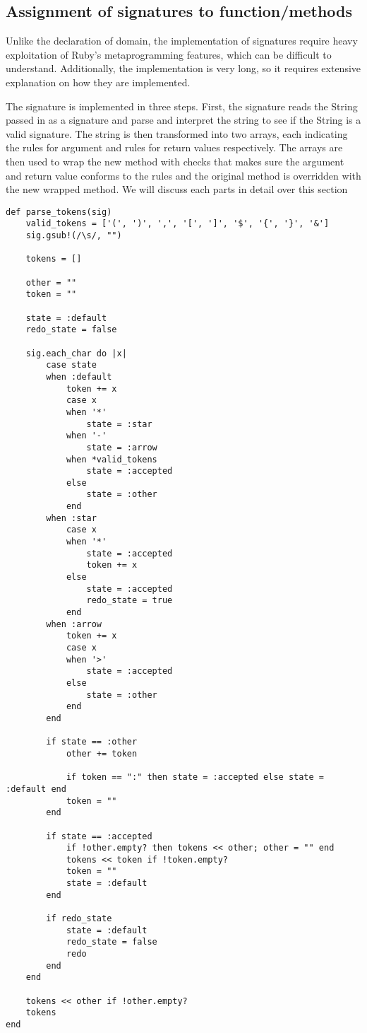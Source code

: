 \subsection{Assignment of signatures to function/methods}

Unlike the declaration of domain, the implementation of signatures require heavy exploitation of Ruby's metaprogramming features, which can be difficult to understand.  Additionally, the implementation is very long, so it requires extensive explanation on how they are implemented.

The signature is implemented in three steps.  First, the signature reads the String passed in as a signature and parse and interpret the string to see if the String is a valid signature.  The string is then transformed into two arrays, each indicating the rules for argument and rules for return values respectively.  The arrays are then used to wrap the new method with checks that makes sure the argument and return value conforms to the rules and the original method is overridden with the new wrapped method.  We will discuss each parts in detail over this section

\begin{lstlisting}[caption={Parser method}]
def parse_tokens(sig)
    valid_tokens = ['(', ')', ',', '[', ']', '$', '{', '}', '&']
    sig.gsub!(/\s/, "")

    tokens = []

    other = ""
    token = ""

    state = :default
    redo_state = false

    sig.each_char do |x|
        case state
        when :default
            token += x
            case x
            when '*'
                state = :star
            when '-'
                state = :arrow
            when *valid_tokens
                state = :accepted
            else
                state = :other
            end
        when :star
            case x
            when '*'
                state = :accepted
                token += x
            else
                state = :accepted
                redo_state = true
            end
        when :arrow
            token += x
            case x
            when '>'
                state = :accepted                   
            else
                state = :other
            end
        end

        if state == :other
            other += token
                
            if token == ":" then state = :accepted else state = :default end
            token = ""
        end
            
        if state == :accepted
            if !other.empty? then tokens << other; other = "" end
            tokens << token if !token.empty?
            token = ""
            state = :default
        end

        if redo_state
            state = :default
            redo_state = false
            redo
        end
    end

    tokens << other if !other.empty?
    tokens
end
\end{lstlisting}

